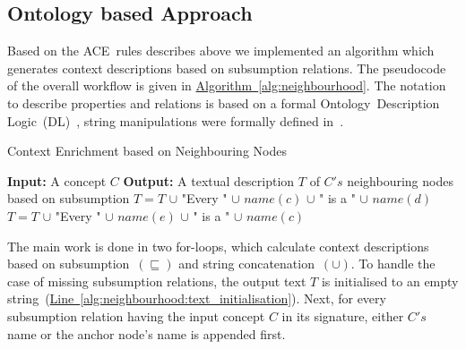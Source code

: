 \subsection{Ontology based Approach}\label{sec:enrichment_ontology_approach}
Based on the ACE~rules describes above we implemented an algorithm which generates context descriptions based on subsumption relations. The pseudocode of the overall workflow is given in \hyperref[alg:neighbourhood]{Algorithm~\ref*{alg:neighbourhood}}. The notation to describe properties and relations is based on a formal Ontology~Description Logic~(DL)~\cite{baader2003}, string manipulations were formally defined in~\cite{hopcroft1969}.

\begin{algorithm}
	\caption{Context Enrichment based on Neighbouring Nodes}\label{alg:neighbourhood}
	\begin{algorithmic}[1]
		\newline
			\textbf{Input:} A concept $C$\newline
			\textbf{Output:} A textual description $T$ of $C's$ neighbouring nodes based on subsumption\newline
			 \label{alg:neighbourhood:text_initialisation}
				\State $T=T$ $\cup$ "Every " $\cup$ $name(c)$ $\cup$ " is a " $\cup$ $name(d)$
			\EndFor
				\State $T=T$ $\cup$ "Every " $\cup$ $name(e)$ $\cup$ " is a " $\cup$ $name(c)$
			\EndFor
		\EndProcedure
	\end{algorithmic}
\end{algorithm}

The main work is done in two for-loops, which calculate context descriptions based on subsumption~$(\sqsubseteq)$ and string concatenation~$(\cup)$. To handle the case of missing subsumption relations, the output text $T$ is initialised to an empty string~(\hyperref[alg:neighbourhood:text_initialisation]{Line~\ref*{alg:neighbourhood:text_initialisation}}). Next, for every subsumption relation having the input concept $C$ in its signature, either $C's$ name or the anchor node's name is appended first.

